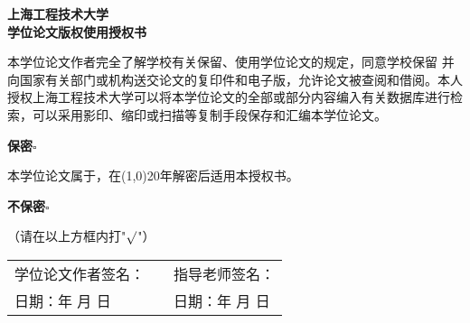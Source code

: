\begin{center}
    \linespread{1.0}
    \heiti\sanhao\textbf{
    上海工程技术大学 \\
    学位论文版权使用授权书}
\end{center}

本学位论文作者完全了解学校有关保留、使用学位论文的规定，同意学校保留
并向国家有关部门或机构送交论文的复印件和电子版，允许论文被查阅和借阅。本人
授权上海工程技术大学可以将本学位论文的全部或部分内容编入有关数据库进行检
索，可以采用影印、缩印或扫描等复制手段保存和汇编本学位论文。

\hspace{8em}\textbf{保密}$\square$ 

本学位论文属于\hspace{5em}，在\line(1,0){20}年解密后适用本授权书。

\hspace{8em}\textbf{不保密}$\square$ 

（请在以上方框内打\quad "\emph{$\surd$}"）

\vspace{15em}
\begin{table}[hbpt]
    \centering
    \renewcommand\arraystretch{1.8}
    \begin{tabular}{p{6cm}<{\raggedright}p{2cm}<{\centering}p{6cm}<{\raggedright}}
        学位论文作者签名：& & 指导老师签名： \\
        日期：\qquad 年 \qquad 月 \qquad 日 & & 日期：\qquad 年 \qquad 月 \qquad 日
    \end{tabular}
\end{table}
\newpage

